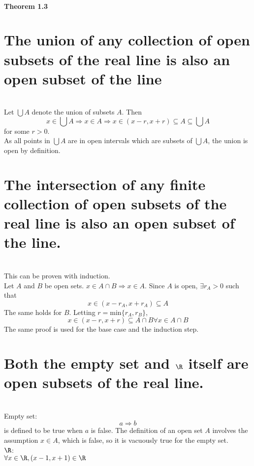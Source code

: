 \subsection{Theorem 1.3}
\setcounter{question}{0}

\question

\begin{parts}
 
 \part{The union of any collection of open subsets of the real line is also an open subset of the line}
 
 
\begin{solution}
 \\ Let $\bigcup A$ denote the union of subsets $A$. Then
$$x \in \bigcup A \Rightarrow x \in A \Rightarrow x \in (x-r,x+r) \subseteq A \subseteq \bigcup A$$
for some $r > 0$. \\
As all points in $\bigcup A$ are in open intervals which are subsets of $\bigcup A$, the union is open by definition.
\end{solution}

\part{The intersection of any finite collection of open subsets of the real line is also an open subset of the line.}

\begin{solution}
 \\This can be proven with induction. \\
Let $A$ and $B$ be open sets. $x \in A \cap B \Rightarrow x \in A$. Since $A$ is open, $\exists r_A > 0$ such that
$$x \in (x-r_A,x+r_A) \subseteq A$$
The same holds for $B$. Letting $r = \text{min}\{r_A,r_B\}$,
$$x \in (x-r,x+r) \subseteq A \cap B \forall x \in A \cap B$$
The same proof is used for the base case and the induction step.
\end{solution}

\part{Both the empty set and $\R$ itself are open subsets of the real line.}

\begin{solution}
 \\Empty set: \\
 $$a \Rightarrow b$$
 is defined to be true when $a$ is false. The definition of an open set $A$ involves the assumption $x \in A$, which is false, so it is vacuously true for the empty set. \\
 $\R$: \\
 $\forall x \in \R, (x-1,x+1) \in \R$
\end{solution}

\end{parts}

